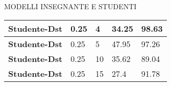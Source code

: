 \begin{frame}{MODELLI INSEGNANTE E STUDENTI}
\begin{minipage}{\linewidth}
\begin{minipage}{0.50\linewidth}
\begin{center}
{\begin{tabular}{|M{1.7cm}||M{1.3cm}|M{1.3cm}||M{1.3cm}|M{1.3cm}|}
            {\bfseries{Studente-Dst}} & 0.25 & 4 & \color{red}34.25 & \color{red}98.63\\
            \hline
            {\bfseries{Studente-Dst}} & 0.25 & 5 & \color{red}47.95 & \color{red}97.26\\
            \hline
            {\bfseries{Studente-Dst}} & 0.25 & 10 & \color{red}35.62 & \color{red}89.04\\
            \hline
            {\bfseries{Studente-Dst}} & 0.25 & 15 & \color{red}27.4 & \color{red}91.78\\
            \hline
         \end{tabular}}
    \end{center}
    \end{minipage}
  \end{minipage}
\end{frame}


  
